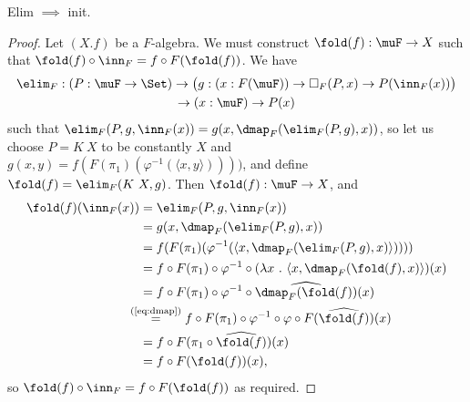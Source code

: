 \documentclass{article}
\begin{document}
\begin{problem}
  Elim $\implies$ init.
\end{problem}
\begin{proof}
  Let $(X. f)$ be a $F$-algebra. We must construct $\fold(f) : \muF
  \to X$ such that $\fold(f) \circ \inn_F = f \circ F(\fold(f))$. We have 
  \begin{multline*}
    \elim_F : (P : \muF \to \Set) \to \big(g : (x : F(\muF)) \to \square_F(P, x) \to P(\inn_F(x))\big) \\ \to (x : \muF) \to P(x)
  \end{multline*}
  such that $\elim_F(P, g, \inn_F(x)) = g(x, \dmap_F(\elim_F(P, g), x))$,
  so let us choose $P = K\ X$ to be constantly $X$ and
$g(x, y) = f(F(\pi_1)(\varphi^{-1}(\langle x, y\rangle))))$, and define $\fold(f) = \elim_F(K\ X, g)$. Then $\fold(f) : \muF \to X$, and
\begin{align*}
  \fold(f)(\inn_F(x)) &= \elim_F(P, g, \inn_F(x)) \\
  &= g(x, \dmap_F(\elim_F(P, g), x)) \\
  &= f(F(\pi_1)(\varphi^{-1}(\langle x, \dmap_F(\elim_F(P, g), x)\rangle)))) \\
  &= f \circ F(\pi_1) \circ \varphi^{-1} \circ (\lambda x\ .\ \langle x, \dmap_F(\fold(f), x)\rangle)(x) \\
  &= f \circ F(\pi_1) \circ \varphi^{-1} \circ \widehat{\dmap_F(\fold(f))}(x) \\
  &\!\!\!\!\!\!\stackrel{\text{(\ref{eq:dmap})}}{=} f \circ F(\pi_1) \circ \varphi^{-1} \circ \varphi \circ F(\widehat{\fold(f)})(x) \\
  &= f \circ F(\pi_1 \circ \widehat{\fold(f)})(x) \\
  &= f \circ F(\fold(f))(x),
\end{align*}
so $\fold(f) \circ \inn_F = f \circ F(\fold(f))$ as required.
\end{proof}
\end{document}
